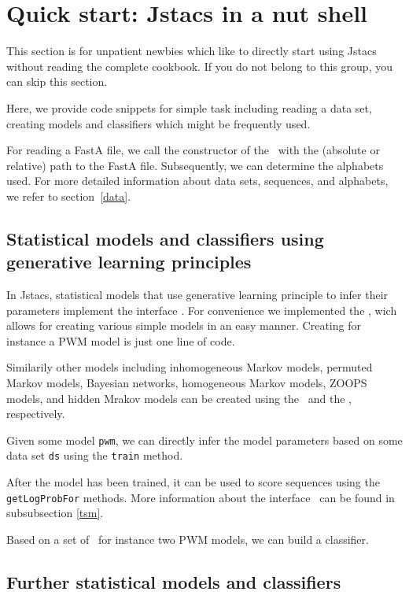 \section{Quick start: Jstacs in a nut shell}\label{start}
\renewcommand{\codefile}{recipes/TrainPWM.java}
This section is for unpatient newbies which like to directly start using Jstacs without reading the complete cookbook. If you do not belong to this group, you can skip this section.

Here, we provide code snippets for simple task including reading a data set, creating models and classifiers which might be frequently used.

For reading a FastA file, we call the constructor of the \DNADataSet~with the (absolute or relative) path to the FastA file. Subsequently, we can determine the alphabets used.
\setcounter{off}{20}
For more detailed information about data sets, sequences, and alphabets, we refer to section~\ref{data}.

\subsection{Statistical models and classifiers using generative learning principles}

In Jstacs, statistical models that use generative learning principle to infer their parameters implement the interface \TrainSM. For convenience we implemented the \TrainSMFactory, wich allows for creating various simple models in an easy manner. Creating for instance a PWM model is just one line of code.
\addtocounter{off}{3}
Similarily other models including inhomogeneous Markov models, permuted Markov models, Bayesian networks, homogeneous Markov models, ZOOPS models, and hidden Mrakov models can be created using the \TrainSMFactory~and the \HMMFactory, respectively.

Given some model \lstinline+pwm+, we can directly infer the model parameters based on some data set \lstinline+ds+ using the \lstinline+train+ method.
\addtocounter{off}{2}
After the model has been trained, it can be used to score sequences using the \lstinline+getLogProbFor+ methods. More information about the interface \TrainSM~can be found in subsubsection \ref{tsm}.

Based on a set of \TrainSM~for instance two PWM models, we can build a classifier.
\renewcommand{\codefile}{\defaultcodefile}
\setcounter{off}{554}

\subsection{Further statistical models and classifiers}

